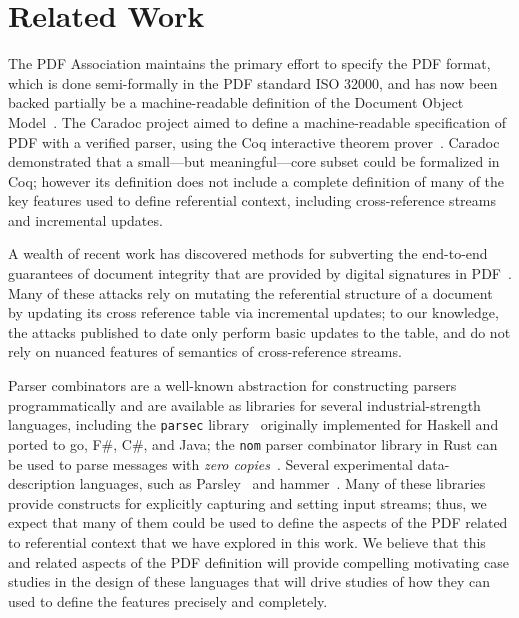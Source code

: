 \section{Related Work}
\label{sec:rel-work}
The PDF Association maintains the primary effort to specify the PDF
format, which is done semi-formally in the PDF standard ISO 32000, and has now
been backed partially be a machine-readable definition of the Document
Object Model~\cite{wyatt2021work}.
%
The Caradoc project aimed to define a machine-readable specification
of PDF with a verified parser, using the Coq interactive theorem
prover~\cite{g.endignouxCaradocPragmaticApproach2016}.
%
Caradoc demonstrated that a small---but meaningful---core subset could
be formalized in Coq;
%
however its definition does not include a complete definition of many
of the key features used to define referential context, including
cross-reference streams and incremental updates.

%
A wealth of recent work has discovered methods for subverting the end-to-end
guarantees of document integrity that are provided by digital
signatures in
PDF~\cite{mullerPracticalDecryptionExFiltration2019,mladenovTrillionDollarRefund2019,mullerProcessingDangerousPaths2021,ndsssymposiumNDSS2021Shadow2021,rohlmannBreakingSpecificationPDF2021}.
%
Many of these attacks rely on mutating the referential structure of a
document by updating its cross reference table via incremental
updates;
%
to our knowledge, the attacks published to date only perform basic
updates to the table, and do not rely on nuanced features of semantics
of cross-reference streams.

Parser combinators are a well-known abstraction for constructing
parsers programmatically and are available as libraries for several
industrial-strength languages, including the \texttt{parsec}
library~\cite{leijen2001parsec} originally implemented for Haskell and
ported to go, F\#, C\#, and Java;
%
the \texttt{nom} parser combinator library in Rust can be used to
parse messages with \emph{zero copies}~\cite{couprie2015nom}.
%
Several experimental data-description languages, such as
Parsley~\cite{mundkurResearchReportParsley2020} and
hammer~\cite{bratus2017curing}.
%
Many of these libraries provide constructs for explicitly capturing
and setting input streams;
%
thus, we expect that many of them could be used to define the aspects
of the PDF related to referential context that we have explored in
this work.
%
We believe that this and related aspects of the PDF definition will
provide compelling motivating case studies in the design of these
languages that will drive studies of how they can used to define the
features precisely and completely.